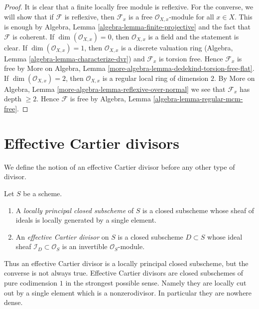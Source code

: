 \begin{proof}
It is clear that a finite locally free module is reflexive.
For the converse, we will show that if $\mathcal{F}$ is
reflexive, then $\mathcal{F}_x$ is a free $\mathcal{O}_{X, x}$-module
for all $x \in X$. This is enough by
Algebra, Lemma \ref{algebra-lemma-finite-projective}
and the fact that $\mathcal{F}$ is coherent.
If $\dim(\mathcal{O}_{X, x}) = 0$, then
$\mathcal{O}_{X, x}$ is a field and the statement is clear.
If $\dim(\mathcal{O}_{X, x}) = 1$, then $\mathcal{O}_{X, x}$
is a discrete valuation ring
(Algebra, Lemma \ref{algebra-lemma-characterize-dvr})
and $\mathcal{F}_x$ is torsion free.
Hence $\mathcal{F}_x$ is free by More on Algebra, Lemma
\ref{more-algebra-lemma-dedekind-torsion-free-flat}.
If $\dim(\mathcal{O}_{X, x}) = 2$, then $\mathcal{O}_{X, x}$
is a regular local ring of dimension $2$. By
More on Algebra, Lemma \ref{more-algebra-lemma-reflexive-over-normal}
we see that $\mathcal{F}_x$ has depth $\geq 2$.
Hence $\mathcal{F}$ is free by
Algebra, Lemma \ref{algebra-lemma-regular-mcm-free}.
\end{proof}







\section{Effective Cartier divisors}
\label{section-effective-Cartier-divisors}

\noindent
We define the notion of an effective Cartier divisor before any other type
of divisor.

\begin{definition}
\label{definition-effective-Cartier-divisor}
Let $S$ be a scheme.
\begin{enumerate}
\item A {\it locally principal closed subscheme} of $S$ is a closed subscheme
whose sheaf of ideals is locally generated by a single element.
\item An {\it effective Cartier divisor} on $S$ is a closed subscheme
$D \subset S$ whose ideal sheaf $\mathcal{I}_D \subset \mathcal{O}_S$
is an invertible $\mathcal{O}_S$-module.
\end{enumerate}
\end{definition}

\noindent
Thus an effective Cartier divisor is a locally principal closed subscheme,
but the converse is not always true. Effective Cartier divisors are closed
subschemes of pure codimension $1$ in the strongest possible sense. Namely
they are locally cut out by a single element which is a nonzerodivisor.
In particular they are nowhere dense.

